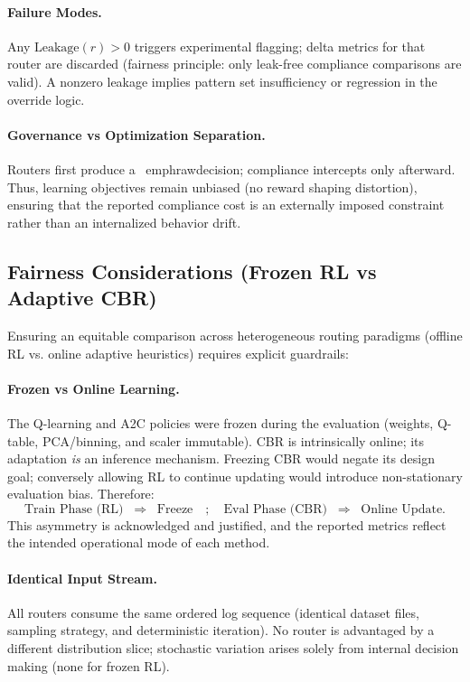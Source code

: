 \paragraph{Failure Modes.}
Any $\text{Leakage}(r)>0$ triggers experimental flagging; delta metrics for that router are discarded (fairness principle: only leak-free compliance comparisons are valid). A nonzero leakage implies pattern set insufficiency or regression in the override logic.

\paragraph{Governance vs Optimization Separation.}
Routers first produce a \ emph{raw}decision; compliance intercepts only afterward. Thus, learning objectives remain unbiased (no reward shaping distortion), ensuring that the reported compliance cost is an externally imposed constraint rather than an internalized behavior drift.

\subsection{Fairness Considerations (Frozen RL vs Adaptive CBR)}
\label{s:eval-fairness}
Ensuring an equitable comparison across heterogeneous routing paradigms (offline RL vs. online adaptive heuristics) requires explicit guardrails:

\paragraph{Frozen vs Online Learning.}
The Q-learning and A2C policies were frozen during the evaluation (weights, Q-table, PCA/binning, and scaler immutable). CBR is intrinsically online; its adaptation \emph{is} an inference mechanism. Freezing CBR would negate its design goal; conversely allowing RL to continue updating would introduce non-stationary evaluation bias. Therefore:
\[
\text{Train Phase (RL)} \;\;\Rightarrow\;\; \text{Freeze} \quad;\quad \text{Eval Phase (CBR)} \;\;\Rightarrow\;\; \text{Online Update}.
\]
This asymmetry is acknowledged and justified, and the reported metrics reflect the intended operational mode of each method.

\paragraph{Identical Input Stream.}
All routers consume the same ordered log sequence (identical dataset files, sampling strategy, and deterministic iteration). No router is advantaged by a different distribution slice; stochastic variation arises solely from internal decision making (none for frozen RL).

